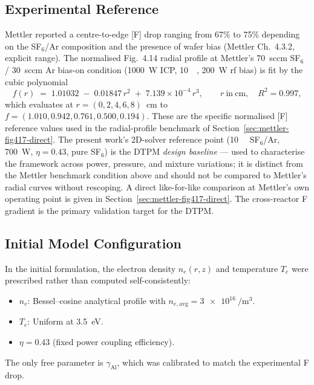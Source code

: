 \documentclass[11pt,a4paper]{report}
\begin{document}
\subsection{Experimental Reference}

Mettler reported a centre-to-edge [F] drop ranging from 67\% to 75\% depending on the SF$_6$/Ar composition and the presence of wafer bias (Mettler Ch.~4.3.2, explicit range).  The normalised Fig.~4.14 radial profile at Mettler's 70~sccm SF$_6$ / 30~sccm Ar bias-on condition (\SI{1000}{\watt} ICP, \SI{10}{\milli\torr}, \SI{200}{\watt} rf bias) is fit by the cubic polynomial
\begin{equation}
  f(r) \;=\; 1.01032 \;-\; 0.01847\,r^{2} \;+\; 7.139\times 10^{-4}\,r^{3},
  \qquad r\ \mathrm{in\ cm}, \quad R^{2} = 0.997,
  \label{eq:mettler-cubic-fit}
\end{equation}
which evaluates at $r = (0, 2, 4, 6, 8)$~cm to $f = (1.010, 0.942, 0.761, 0.500, 0.194)$.  These are the specific normalised [F] reference values used in the radial-profile benchmark of Section~\ref{sec:mettler-fig417-direct}.  The present work's 2D-solver reference point (\SI{10}{\milli\torr} SF$_6$/Ar, \SI{700}{\watt}, $\eta = 0.43$, pure SF$_6$) is the DTPM \emph{design baseline} --- used to characterise the framework across power, pressure, and mixture variations; it is distinct from the Mettler benchmark condition above and should not be compared to Mettler's radial curves without rescoping.  A direct like-for-like comparison at Mettler's own operating point is given in Section~\ref{sec:mettler-fig417-direct}.  The cross-reactor F gradient is the primary validation target for the DTPM.

\subsection{Initial Model Configuration}

In the initial formulation, the electron density $n_e(r,z)$ and temperature $T_e$ were prescribed rather than computed self-consistently:
\begin{itemize}
  \item $n_e$: Bessel--cosine analytical profile with $n_{e,\mathrm{avg}} = \SI{3e16}{\per\meter\cubed}$.
  \item $T_e$: Uniform at \SI{3.5}{\electronvolt}.
  \item $\eta = 0.43$ (fixed power coupling efficiency).
\end{itemize}

The only free parameter is $\gamma_\mathrm{Al}$, which was calibrated to match the experimental F drop.
\end{document}
